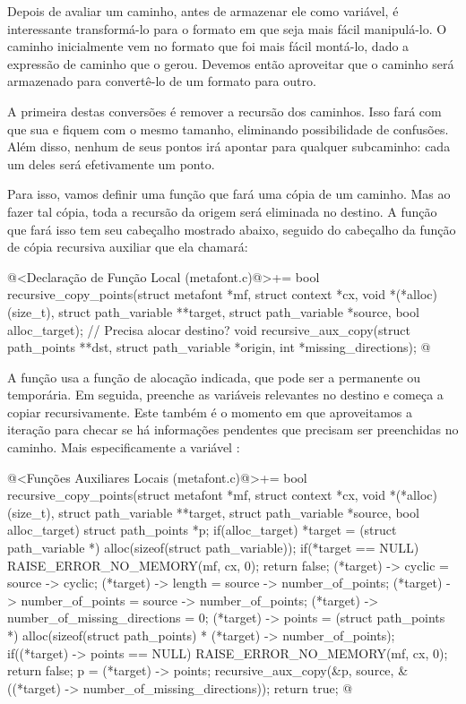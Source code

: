Depois de avaliar um caminho, antes de armazenar ele como variável, é
interessante transformá-lo para o formato em que seja mais fácil
manipulá-lo. O caminho inicialmente vem no formato que foi mais fácil
montá-lo, dado a expressão de caminho que o gerou. Devemos então
aproveitar que o caminho será armazenado para convertê-lo de um
formato para outro.

A primeira destas conversões é remover a recursão dos caminhos. Isso
fará com que sua  e 
fiquem com o mesmo tamanho, eliminando possibilidade de
confusões. Além disso, nenhum de seus pontos irá apontar para qualquer
subcaminho: cada um deles será efetivamente um ponto.

Para isso, vamos definir uma função que fará uma cópia de um
caminho. Mas ao fazer tal cópia, toda a recursão da origem será
eliminada no destino. A função que fará isso tem seu cabeçalho
mostrado abaixo, seguido do cabeçalho da função de cópia recursiva
auxiliar que ela chamará:

\iniciocodigo
@<Declaração de Função Local (metafont.c)@>+=
bool recursive_copy_points(struct metafont *mf, struct context *cx,
                           void *(*alloc)(size_t),
                           struct path_variable **target,
                           struct path_variable *source,
                           bool alloc_target); // Precisa alocar destino?
void recursive_aux_copy(struct path_points **dst,
                        struct path_variable *origin, int *missing_directions);
@
\fimcodigo

A função usa a função de alocação indicada, que pode ser a permanente
ou temporária. Em seguida, preenche as variáveis relevantes no destino
e começa a copiar recursivamente. Este também é o momento em que
aproveitamos a iteração para checar se há informações pendentes que
precisam ser preenchidas no caminho. Mais especificamente a
variável :

\iniciocodigo
@<Funções Auxiliares Locais (metafont.c)@>+=
bool recursive_copy_points(struct metafont *mf, struct context *cx,
                          void *(*alloc)(size_t),
                          struct path_variable **target,
                          struct path_variable *source,
                          bool alloc_target){
  struct path_points *p;
  if(alloc_target){
    *target = (struct path_variable *) alloc(sizeof(struct path_variable));
    if(*target == NULL){
      RAISE_ERROR_NO_MEMORY(mf, cx, 0);
      return false;
    }
  }
  (*target) -> cyclic = source -> cyclic;
  (*target) -> length = source -> number_of_points;
  (*target) -> number_of_points = source -> number_of_points;
  (*target) -> number_of_missing_directions = 0;
  (*target) -> points = (struct path_points *)
                          alloc(sizeof(struct path_points) *
                                (*target) -> number_of_points);
  if((*target) -> points == NULL){
    RAISE_ERROR_NO_MEMORY(mf, cx, 0);
    return false;
  }
  p = (*target) -> points;
  recursive_aux_copy(&p, source, &((*target) -> number_of_missing_directions));
  return true;
}
@
\fimcodigo

